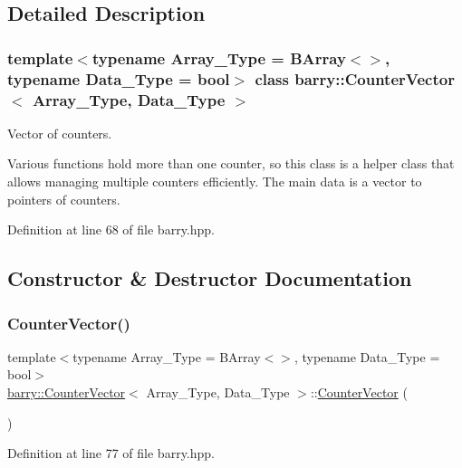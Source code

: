 \subsection{Detailed Description}
\subsubsection*{template$<$typename Array\+\_\+\+Type = B\+Array$<$$>$, typename Data\+\_\+\+Type = bool$>$\newline
class barry\+::\+Counter\+Vector$<$ Array\+\_\+\+Type, Data\+\_\+\+Type $>$}

Vector of counters. 

Various functions hold more than one counter, so this class is a helper class that allows managing multiple counters efficiently. The main data is a vector to pointers of counters. 

Definition at line 68 of file barry.\+hpp.



\subsection{Constructor \& Destructor Documentation}
\mbox{\label{classbarry_1_1_counter_vector_a620e7a96ebfd05fe71da6476f27c2850}} 
\subsubsection{\texorpdfstring{Counter\+Vector()}{CounterVector()}\hspace{0.1cm}{\footnotesize\ttfamily [1/2]}}
{\footnotesize\ttfamily template$<$typename Array\+\_\+\+Type = B\+Array$<$$>$, typename Data\+\_\+\+Type = bool$>$ \\
\hyperlink{classbarry_1_1_counter_vector}{barry\+::\+Counter\+Vector}$<$ Array\+\_\+\+Type, Data\+\_\+\+Type $>$\+::\hyperlink{classbarry_1_1_counter_vector}{Counter\+Vector} (\begin{DoxyParamCaption}{ }\end{DoxyParamCaption})\hspace{0.3cm}{\ttfamily [inline]}}



Definition at line 77 of file barry.\+hpp.

